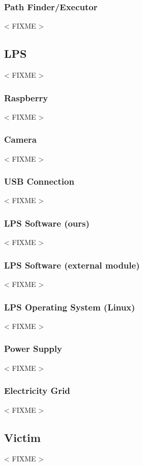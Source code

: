 \documentclass[a4paper,parskip,headheight=38pt]{scrartcl} %
\newcommand{\incomplete}[1]{\textless{} #1 \textgreater{}}
\begin{document}
\subsubsection{Path Finder/Executor} %
\incomplete{FIXME}

\subsection{LPS}
\incomplete{FIXME}

\subsubsection{Raspberry}
\incomplete{FIXME}

\subsubsection{Camera}
\incomplete{FIXME}

\subsubsection{USB Connection}
\incomplete{FIXME}

\subsubsection{LPS Software (ours)}
\incomplete{FIXME}

\subsubsection{LPS Software (external module)}
\incomplete{FIXME}

\subsubsection{LPS Operating System (Linux)}
\incomplete{FIXME}

\subsubsection{Power Supply}
\incomplete{FIXME}

\subsubsection{Electricity Grid}
\incomplete{FIXME}

\subsection{Victim}
\incomplete{FIXME}
\end{document}
